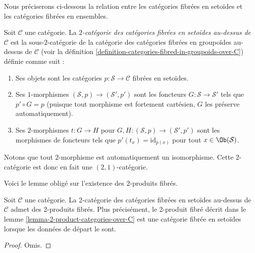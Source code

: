 \noindent
Nous préciserons ci-dessous la relation entre les catégories fibrées en
setoïdes et les catégories fibrées en ensembles.

\begin{definition}
\label{definition-categories-fibred-in-setoids-over-C}
Soit $\mathcal{C}$ une catégorie.
La {\it $2$-catégorie des catégories fibrées en setoïdes
au-dessus de $\mathcal{C}$} est la sous-$2$-catégorie de la catégorie des
catégories fibrées en groupoïdes au-dessus de $\mathcal{C}$ (voir la
définition \ref{definition-categories-fibred-in-groupoids-over-C})
définie comme suit :
\begin{enumerate}
\item Ses objets sont les catégories
$p : \mathcal{S} \to \mathcal{C}$ fibrées en setoïdes.
\item Ses $1$-morphismes $(\mathcal{S}, p) \to (\mathcal{S}', p')$
sont les foncteurs $G : \mathcal{S} \to \mathcal{S}'$ tels que
$p' \circ G = p$ (puisque tout morphisme est fortement cartésien,
$G$ les préserve automatiquement).
\item Ses $2$-morphismes $t : G \to H$ pour
$G, H : (\mathcal{S}, p) \to (\mathcal{S}', p')$
sont les morphismes de foncteurs
tels que $p'(t_x) = \text{id}_{p(x)}$
pour tout $x \in \Ob(\mathcal{S})$.
\end{enumerate}
\end{definition}

\noindent
Notons que tout $2$-morphisme est automatiquement un isomorphisme.
Cette $2$-catégorie est donc en fait une $(2, 1)$-catégorie.

\noindent
Voici le lemme obligé sur l'existence des $2$-produits fibrés.

\begin{lemma}
\label{lemma-2-product-categories-fibred-setoids}
Soit $\mathcal{C}$ une catégorie.
La 2-catégorie des catégories fibrées en setoïdes au-dessus de
$\mathcal{C}$ admet des 2-produits fibrés. Plus précisément, le 2-produit fibré
décrit dans le lemme \ref{lemma-2-product-categories-over-C} est une catégorie
fibrée en setoïdes lorsque les données de départ le sont.
\end{lemma}

\begin{proof}
Omis.
\end{proof}

